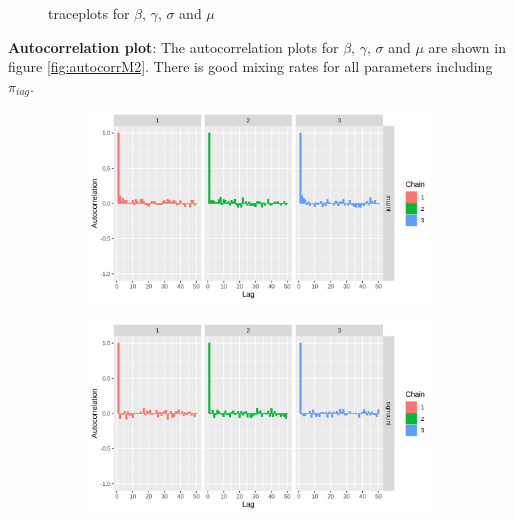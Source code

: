 \documentclass[12pt]{article}
\begin{document}
\begin{figure}[h!]
    \caption{traceplots for $\beta$, $\gamma$, $\sigma$ and $\mu$ }
    \label{fig:traceplotsm2}
\end{figure}

\textbf{Autocorrelation plot}: The autocorrelation plots for $\beta$, $\gamma$, $\sigma$ and $\mu$ are shown in figure \ref{fig:autocorrM2}. There is good mixing rates for all parameters including $\pi_{iag}$.

\begin{figure}[h!]
    \centering
    \begin{subfigure}{0.45\textwidth}
        \includegraphics[width=\linewidth]{pictures/mod2/mod2autocorr_muint.png}
    \end{subfigure}
    \begin{subfigure}{0.45\textwidth}
        \includegraphics[width=\linewidth]{pictures/mod2/mod2autocorr_sigmaint.png}
    \end{subfigure}


\end{figure}
\end{document}
